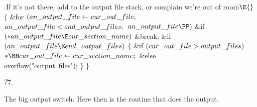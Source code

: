 \B{}:If it's not there, add  to the output
file stack, or complain we're out of room\X${}\E{}$\6
${}\{{}$\1\6
\&{for} ${}(\\{an\_output\_file}\leftarrow\\{cur\_out\_file};{}$ ${}\\{an\_output%
\_file}<\\{end\_output\_files};{}$ ${}\\{an\_output\_file}\PP){}$\1\6
\&{if} ${}({*}\\{an\_output\_file}\E\\{cur\_section\_name}){}$\1\5
\&{break};\2\2\6
\&{if} ${}(\\{an\_output\_file}\E\\{end\_output\_files}){}$\5
${}\{{}$\1\6
\&{if} ${}(\\{cur\_out\_file}>\\{output\_files}){}$\1\5
${}{*}\MM\\{cur\_out\_file}\K\\{cur\_section\_name};{}$\2\6
\&{else}\1\5
\\{overflow}(\.{"output\ files"});\2\6
\4${}\}{}$\2\6
\4${}\}{}$\2\par
\U77.\fi

The big output switch.  Here then is the routine that does the
output.

